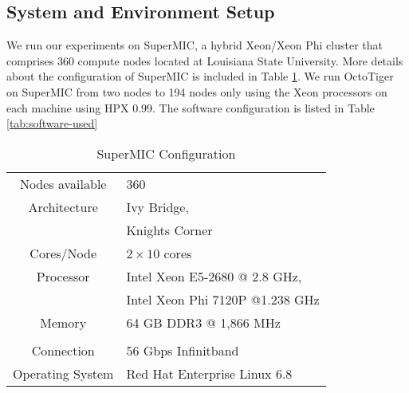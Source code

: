 \subsection{System and Environment Setup}
We run our experiments on SuperMIC, a hybrid Xeon/Xeon Phi cluster that
comprises 360 compute nodes located at Louisiana State University. More
details about the configuration of SuperMIC is included in Table
\ref{tab:machines}. We run OctoTiger on SuperMIC from
two nodes to 194 nodes only using the Xeon processors on each machine using
HPX 0.99\cite{hartmut_kaiser_2015_33656}. The software configuration is listed in Table  \ref{tab:software-used}


\begin{table}
    \caption{SuperMIC Configuration}
    \centering
    \label{tab:machines}
    \begin{tabular}{cl}  
        \toprule
        Nodes available  & 360                             \\
        Architecture     & Ivy Bridge,                     \\
                         & Knights Corner                  \\
        Cores/Node       & $2 \times 10$ cores             \\
        Processor        & Intel Xeon E5-2680 @ 2.8 GHz,   \\
                         & Intel Xeon Phi 7120P @1.238 GHz \\
        Memory           & 64 GB DDR3 @ 1,866 MHz          \\
                         &                                 \\
        Connection       & 56 Gbps Infinitband             \\
        Operating System & Red Hat Enterprise Linux 6.8    \\
        \bottomrule
    \end{tabular}
\end{table}

